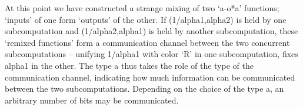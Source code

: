 \documentclass[preprint]{sigplanconf}
\begin{document}
\begin{itemize}
\end{itemize}

At this point we have constructed a strange mixing of two `{{a-o*a}}'
functions; `inputs' of one form `outputs' of the other. If
{{(1/alpha1,alpha2)}} is held by one subcomputation and
{{(1/alpha2,alpha1)}} is held by another subcomputation, these
`remixed functions' form a communication channel between the two
concurrent subcomputations -- unifying {{1/alpha1}} with {{color}}
`{{R}}' in one subcomputation, fixes {{alpha1}} in the other. The type
{{a}} thus takes the role of the type of the communication channel,
indicating how much information can be communicated between the two
subcomputations.  Depending on the choice of the type {{a}}, an
arbitrary number of bits may be communicated.
\end{document}
